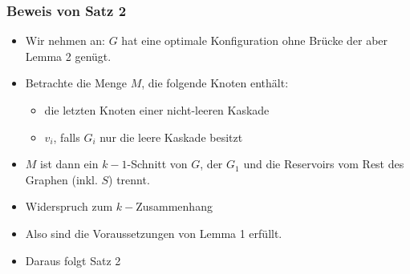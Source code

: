 \documentclass{beamer}
\theoremstyle{definition}
\theoremstyle{plain}
\begin{document}
\begin{frame}
\frametitle{Beweis von Satz 2}
\begin{itemize}[<+->]
\item Wir nehmen an: $G$ hat eine optimale Konfiguration ohne Brücke der aber Lemma 2 genügt.
\item Betrachte die Menge $M$, die folgende Knoten enthält:
\begin{itemize}[<+->]
\item die letzten Knoten einer nicht-leeren Kaskade
\item $v_i$, falls $G_i$ nur die leere Kaskade besitzt
\end{itemize}
\item $M$ ist dann ein $k-1$-Schnitt von $G$, der $G_1$ und die Reservoirs vom Rest des Graphen (inkl. $S$) trennt.
\item Widerspruch zum $k-$Zusammenhang
\item Also sind die Voraussetzungen von Lemma 1 erfüllt.
\item Daraus folgt Satz 2
\end{itemize}
\end{frame}
\end{document}
